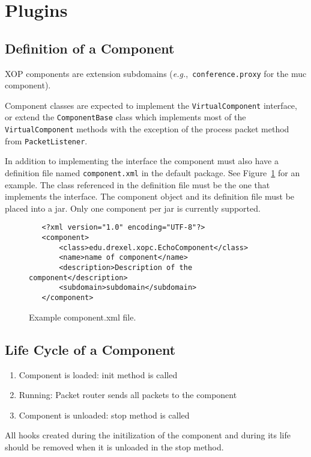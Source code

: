 \documentclass{article}
\newcommand{\code}[1]{\texttt{#1}}
\newcommand{\eg}{\textit{e.g.},~}
\begin{document}
\section{Plugins}
\subsection{Definition of a Component}
XOP components are extension subdomains (\eg \code{conference.proxy} for the
muc component).

Component classes are expected to implement the \code{VirtualComponent}
interface, or extend the \code{ComponentBase} class which implements most of
the \code{VirtualComponent} methods with the exception of the process packet
method from \code{PacketListener}.  

In addition to implementing the interface the component must also have a
definition file named \code{component.xml} in the default package.  See
Figure~\ref{fig:component-xml} for an example.  The class referenced in the
definition file must be the one that implements the interface.  The component
object and its definition file must be placed into a jar.  Only one component
per jar is currently supported. 



\begin{figure}
\begin{verbatim}
   <?xml version="1.0" encoding="UTF-8"?>
   <component>
       <class>edu.drexel.xopc.EchoComponent</class>
       <name>name of component</name>
       <description>Description of the component</description>
       <subdomain>subdomain</subdomain>
   </component>
\end{verbatim}
\caption{Example component.xml file.}
\label{fig:component-xml}
\end{figure}

\subsection{Life Cycle of a Component}
\begin{enumerate}
\item Component is loaded: init method is called
\item Running: Packet router sends all packets to the component
\item Component is unloaded: stop method is called
\end{enumerate}
All hooks created during the initilization of the component and during
its life should be removed when it is unloaded in the stop method.
\end{document}
